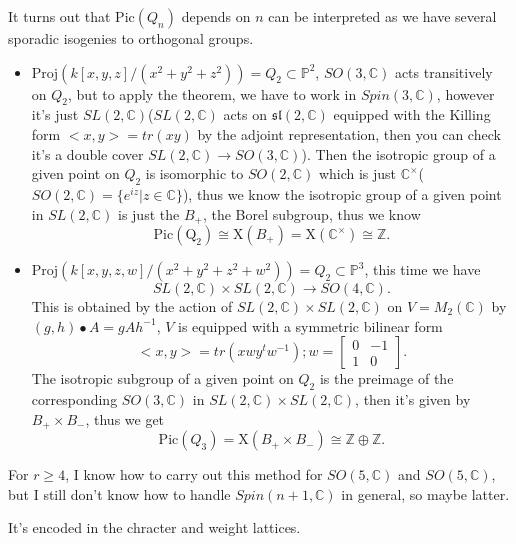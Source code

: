 \documentclass[../main.tex]{subfiles}
\begin{document}
\begin{example}
It turns out that $\mathrm{Pic}(Q_{n})$ depends on $n$ can be interpreted as we have several sporadic isogenies to orthogonal groups.
\begin{itemize}
\item $\mathrm{Proj}(k[x,y,z]/(x^{2}+y^{2}+z^{2}))=Q_{2}\subset \mathbb{P}^{2}$, $SO(3,\mathbb{C})$ acts transitively on $Q_{2}$, but to apply the theorem, we have to work in $Spin(3,\mathbb{C})$, however it's just $SL(2,\mathbb{C})$($SL(2,\mathbb{C})$ acts on $\mathfrak{sl}(2,\mathbb{C})$ equipped with the Killing form $<x,y>=tr(xy)$ by the adjoint representation, then you can check it's a double cover $SL(2,\mathbb{C})\rightarrow SO(3,\mathbb{C})$). Then the isotropic group of a given point on $Q_{2}$ is isomorphic to $SO(2,\mathbb{C})$ which is just $\mathbb{C}^{\times}$($SO(2,\mathbb{C})=\{e^{iz}|z\in \mathbb{C}\}$), thus we know the isotropic group of a given point in $SL(2,\mathbb{C})$ is just the $B_{+}$, the Borel subgroup, thus we know 
$$\mathrm{Pic(Q_{2})}\cong \mathrm{X}(B_{+})=\mathrm{X}(\mathbb{C}^{\times}) \cong \mathbb{Z}.$$
\item $\mathrm{Proj}(k[x,y,z,w]/(x^{2}+y^{2}+z^{2}+w^{2}))=Q_{2}\subset \mathbb{P}^{3}$, this time we have 
$$SL(2,\mathbb{C})\times SL(2,\mathbb{C})\rightarrow SO(4,\mathbb{C}).$$
This is obtained by the action of $SL(2,\mathbb{C})\times SL(2,\mathbb{C})$ on $V=M_{2}(\mathbb{C})$  by $(g,h)\bullet A=gAh^{-1}$, $V$ is equipped with a symmetric bilinear form $$<x,y>=tr(xwy^{t}w^{-1}); w=\begin{bmatrix}0 & -1\\
1 & 0\end{bmatrix}.$$
The isotropic subgroup of a given point on $Q_{2}$ is the preimage of the corresponding $SO(3,\mathbb{C})$ in $SL(2,\mathbb{C})\times SL(2,\mathbb{C})$, then it's given by $B_{+}\times B_{-}$, thus we get 
$$\mathrm{Pic}(Q_{3})=\mathrm{X}(B_{+}\times B_{-})\cong \mathbb{Z}\oplus \mathbb{Z}.$$
\end{itemize}
\end{example}
\begin{remark}[????]
For $r\geq 4$, I know how to carry out this method for $SO(5,\mathbb{C})$ and $SO(5,\mathbb{C})$, but I still don't know how to handle $Spin(n+1,\mathbb{C})$ in general, so maybe latter.
\end{remark}


\begin{remark}[When do we have  $\mathrm{X}(G)=0$?]
It's encoded in the chracter and weight lattices.
\end{remark}
\end{document}
